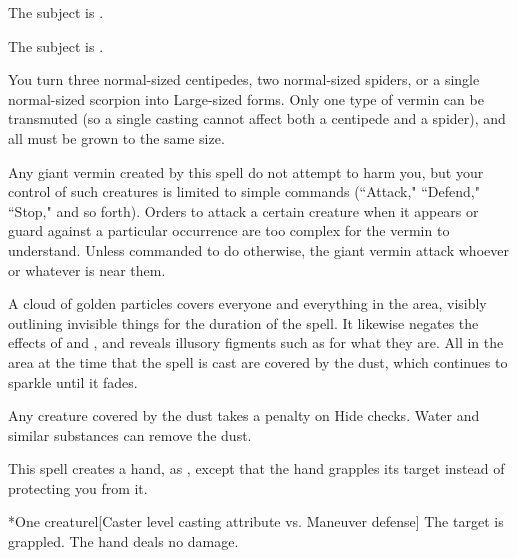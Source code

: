 \begin{spellhealthy}
    The subject is \sickened.
\end{spellhealthy}
\begin{spellblood}
    The subject is \nauseated.
\end{spellblood}

\spelldur{\durmed}
\spelleffect You turn three normal-sized centipedes, two normal-sized spiders, or a single normal-sized scorpion into Large-sized forms. Only one type of vermin can be transmuted (so a single casting cannot affect both a centipede and a spider), and all must be grown to the same size.
\par Any giant vermin created by this spell do not attempt to harm you, but your control of such creatures is limited to simple commands (``Attack," ``Defend," ``Stop," and so forth). Orders to attack a certain creature when it appears or guard against a particular occurrence are too complex for the vermin to understand. Unless commanded to do otherwise, the giant vermin attack whoever or whatever is near them.

\spelldur{\durshort}
\spelleffect A cloud of golden particles covers everyone and everything in the area, visibly outlining invisible things for the duration of the spell. It likewise negates the effects of  and , and reveals illusory figments such as  for what they are. All in the area at the time that the spell is cast are covered by the dust, which continues to sparkle until it fades.
\par Any creature covered by the dust takes a  penalty on Hide checks.
\spelleffect Water and similar substances can remove the dust.

\spellrng{\rngmed}
\spelldur{\durshort \dismissable}
\spellline
\spelleffect This spell creates a hand, as , except that the hand grapples its target instead of protecting you from it.
\begin{spelltarget}*{One creature}l[Caster level \add casting attribute vs. Maneuver defense]
    \spellsuccess The target is grappled. The hand deals no damage.
\end{spelltarget}

